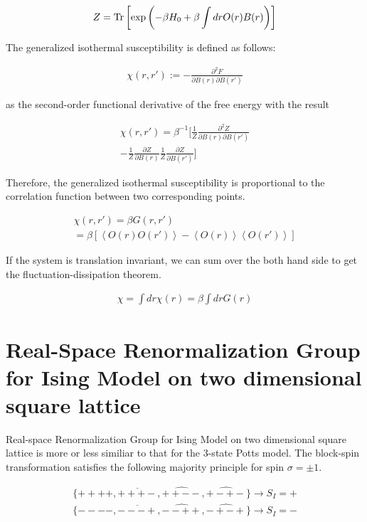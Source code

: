 \documentclass[%
 reprint,
 amsmath,amssymb,
 aps,
]{revtex4-2}
\begin{document}
\begin{eqnarray}
Z = \Tr\left[\exp\left(-\beta H_{0} + \beta \int dr O(r)B(r)\right)\right]
\end{eqnarray}

The generalized isothermal susceptibility is defined as follows:

\begin{eqnarray}
\chi(r,r') := -\frac{\partial^2 F}{\partial B(r) \partial B(r')}
\end{eqnarray}

as the second-order functional derivative of the free energy with the result

\begin{multline}
\chi(r,r') = \beta^{-1} \bigg[\frac{1}{Z} \frac{\partial^2 Z}{\partial B(r) \partial B(r')} \\
-\frac{1}{Z}\frac{\partial Z}{\partial B(r)} \frac{1}{Z} \frac{\partial Z}{\partial B(r')} \bigg]
\end{multline}

Therefore, the generalized isothermal susceptibility is proportional to the correlation 
function between two corresponding points.

\begin{multline}
\chi(r,r') = \beta G(r,r') \\
= \beta \left[\left<O(r)O(r')\right>-\left<O(r)\right>\left<O(r')\right>\right]
\end{multline}

If the system is translation invariant, we can sum over the both hand side to get the 
fluctuation-dissipation theorem.

\begin{eqnarray}
\chi = \int dr \chi(r) = \beta \int dr G(r)
\end{eqnarray}

\section{\label{appx:rsrg-ising}Real-Space Renormalization Group for Ising Model on 
two dimensional square lattice}
Real-space Renormalization Group for Ising Model on two dimensional square lattice is more 
or less similiar to that for the 3-state Potts model. The block-spin transformation satisfies
the following majority principle for spin $\sigma = \pm 1$.

\begin{gather}
\{++++,\overline{+++-},\widehat{++--},\widehat{+-+-}\} \rightarrow S_{I} = + \\
\{----,\overline{---+},\widehat{--++},\widehat{-+-+}\} \rightarrow S_{I} = -
\end{gather}
\end{document}
